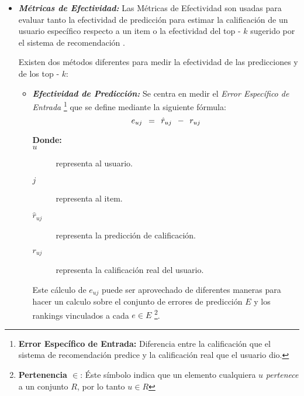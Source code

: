     \begin{itemize}
        \item \textbf{\textit{Métricas de Efectividad: }} Las Métricas de Efectividad son usadas para evaluar tanto la efectividad de predicción para estimar la calificación de un usuario específico respecto a un item o la efectividad del top - $k$ sugerido por el sistema de recomendación \parencite{Aggarwal2016}.
        
        Existen dos métodos diferentes para medir la efectividad de las predicciones y de los top - $k$:

        \begin{itemize}[label=$\diamond$]
            \item \textbf{\emph{Efectividad de Predicción: }} Se centra en medir el \textit{Error Específico de Entrada} \footnote{\textbf{Error Específico de Entrada: } Diferencia entre la calificación que el sistema de recomendación predice y la calificación real que el usuario dio.} que se define mediante la siguiente fórmula:
            \begin{equation}
                \Large e_{uj} \ = \ \hat{r}_{uj} \ - \ r_{uj}
            \addequation{Definición de Error Específico de Entrada}
            \end{equation}

            \begin{description}
                \item[\textbf{Donde: }] 
                \item[$u$] representa al usuario.
                \item[$j$] representa al item.
                \item[$\hat{r}_{uj}$] representa la predicción de calificación.
                \item[$r_{uj}$] representa la calificación real del usuario. 
            \end{description}

            \newpage
            \thispagestyle{plain}
            \vspace*{0.2cm}

            Este cálculo de $e_{uj}$ puede ser aprovechado de diferentes maneras para hacer un calculo sobre el conjunto de errores de predicción $E$ y los rankings vinculados a cada $e \in E$ \footnote{\textbf{Pertenencia $\in$}: Éste símbolo indica que un elemento cualquiera $u$ \textit{pertenece} a un conjunto $R$, por lo tanto $u \in R$}.


\end{itemize}
\end{itemize}
